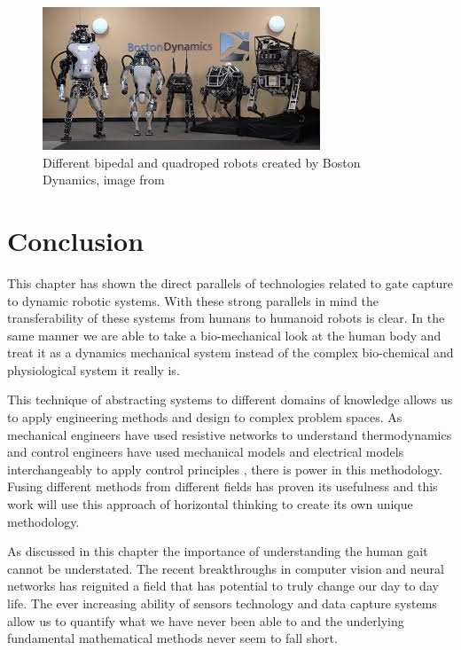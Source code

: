 \begin{figure}[!ht] 
\captionsetup{width=0.75\linewidth, font=small}  
\includegraphics[width=0.75\linewidth]{figures/boston.jpg}
\caption{Different bipedal and quadroped robots created by Boston Dynamics, image from \cite{bostondynamics}}
\label{fig:boston}
\end{figure}  


\section{Conclusion}
This chapter has shown the direct parallels of technologies related to gate capture to dynamic robotic systems. With these strong parallels in mind the transferability of these systems from humans to humanoid robots is clear. In the same manner we are able to take a bio-mechanical look at the human body and treat it as a dynamics mechanical system instead of the complex bio-chemical and physiological system it really is.

This technique of abstracting systems to different domains of knowledge allows us to apply engineering methods and design to complex problem spaces. As mechanical engineers have used resistive networks to understand thermodynamics \cite{chen2015electrical} and control engineers have used mechanical models and electrical models interchangeably to apply control principles \cite{karnopp2012system}, there is power in this methodology. Fusing different methods from different fields has proven its usefulness and this work will use this approach of horizontal thinking to create its own unique methodology.

As discussed in this chapter the importance of understanding the human gait cannot be understated. The recent breakthroughs in computer vision and neural networks has reignited a field that has potential to truly change our day to day life. The ever increasing ability of sensors technology and data capture systems allow us to quantify what we have never been able to and the underlying fundamental mathematical methods never seem to fall short.

